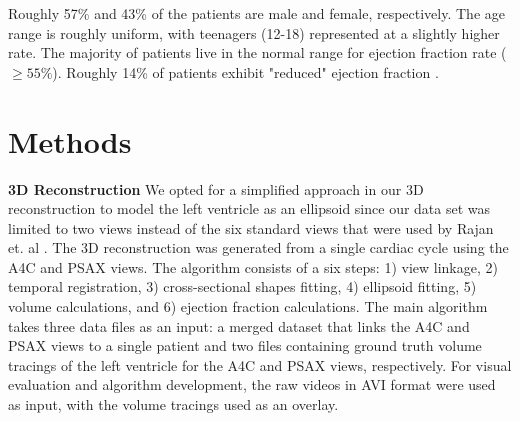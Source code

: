 \documentclass{article}
\begin{document}
Roughly 57\% and 43\% of the patients are male and female, respectively. The age range is roughly uniform, with  teenagers (12-18) represented at a slightly higher rate. The majority of patients live in the normal range for ejection fraction rate ($\geq 55\%$). Roughly 14\% of patients exhibit "reduced" ejection fraction \cite{hf}.  


\section{Methods}\label{sec2}





\noindent
\textbf{3D Reconstruction}
We opted for a simplified approach in our 3D reconstruction to model the left ventricle as an ellipsoid \cite{lvshape,echoautosegcnn} since our data set was limited to two views instead of the six standard views that were used by Rajan et. al \cite{rajan2016}. The 3D reconstruction was generated from a single cardiac cycle using the A4C and PSAX views. The algorithm consists of a six steps: 1) view linkage, 2) temporal registration, 3) cross-sectional shapes fitting, 4) ellipsoid fitting, 5) volume calculations, and 6) ejection fraction calculations.  The main algorithm takes three data files as an input: a merged dataset that links the A4C and PSAX views to a single patient and two files containing ground truth volume tracings of the left ventricle for the A4C and PSAX views, respectively.  For visual evaluation and algorithm development, the raw videos in AVI format were used as input, with the volume tracings used as an overlay. 
\end{document}
